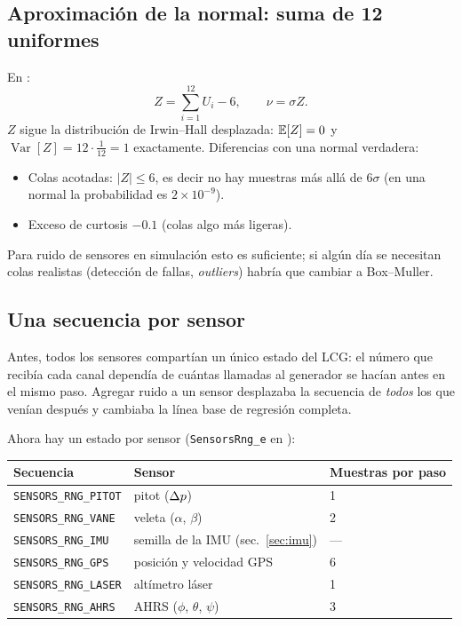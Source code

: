 \documentclass[11pt,a4paper]{article}
\begin{document}
\subsection{Aproximación de la normal: suma de 12 uniformes}

En :
\begin{equation}
  Z = \sum_{i=1}^{12} U_i - 6, \qquad \nu = \sigma Z .
\end{equation}
$Z$ sigue la distribución de Irwin--Hall desplazada: $\mathbb{E}[Z]=0$ y
$\operatorname{Var}[Z] = 12\cdot\tfrac{1}{12} = 1$ exactamente. Diferencias con
una normal verdadera:
\begin{itemize}
  \item Colas acotadas: $|Z| \le 6$, es decir no hay muestras más allá de
        $6\sigma$ (en una normal la probabilidad es $2\times10^{-9}$).
  \item Exceso de curtosis $-0.1$ (colas algo más ligeras).
\end{itemize}
Para ruido de sensores en simulación esto es suficiente; si algún día se
necesitan colas realistas (detección de fallas, \emph{outliers}) habría que
cambiar a Box--Muller.

\subsection{Una secuencia por sensor}

Antes, todos los sensores compartían un único estado del LCG: el número que
recibía cada canal dependía de cuántas llamadas al generador se hacían antes
en el mismo paso. Agregar ruido a un sensor desplazaba la secuencia de
\emph{todos} los que venían después y cambiaba la línea base de regresión
completa.

Ahora hay un estado por sensor (\texttt{SensorsRng\_e} en
):

\begin{center}
\begin{tabular}{lll}
\toprule
Secuencia & Sensor & Muestras por paso \\
\midrule
\texttt{SENSORS\_RNG\_PITOT} & pitot ($\Delta p$)                     & 1 \\
\texttt{SENSORS\_RNG\_VANE}  & veleta ($\alpha$, $\beta$)         & 2 \\
\texttt{SENSORS\_RNG\_IMU}   & semilla de la IMU (sec.~\ref{sec:imu}) & --- \\
\texttt{SENSORS\_RNG\_GPS}   & posición y velocidad GPS           & 6 \\
\texttt{SENSORS\_RNG\_LASER} & altímetro láser                    & 1 \\
\texttt{SENSORS\_RNG\_AHRS}  & AHRS ($\phi$, $\theta$, $\psi$)   & 3 \\
\bottomrule
\end{tabular}
\end{center}
\end{document}
